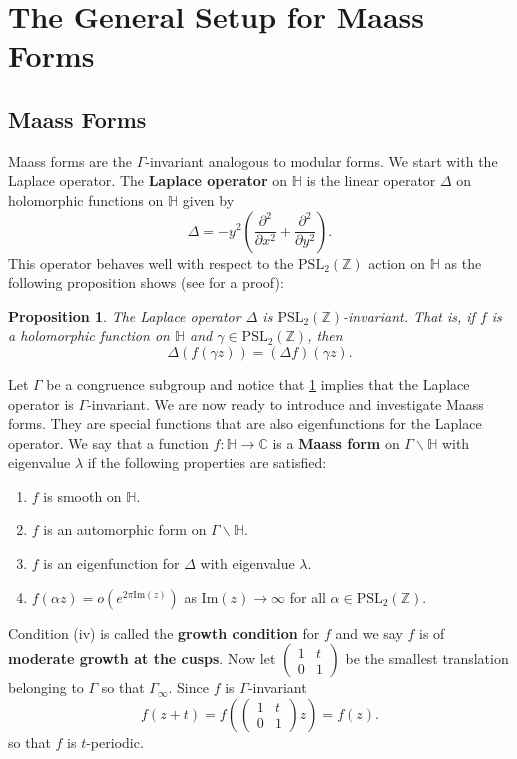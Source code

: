 \documentclass[12pt]{book}
\newtheorem{proposition}{Proposition}[section]
\theoremstyle{definition}\newframedtheorem{method}{Method}
\newcommand{\PSL}{\mathrm{PSL}}
\newcommand{\Z}{\mathbb{Z}}
\newcommand{\C}{\mathbb{C}}
\renewcommand{\H}{\mathbb{H}}
\renewcommand{\a}{\alpha}
\newcommand{\g}{\gamma}
\renewcommand{\l}{\lambda}
\newcommand{\G}{\Gamma}
\newcommand{\D}{\Delta}
\newcommand{\del}{\partial}
\newcommand{\<}{\langle}
\renewcommand{\>}{\rangle}
\renewcommand{\Im}{\mathrm{Im}}
\newcommand{\GH}{\G\backslash\H}
\begin{document}
  \section{The General Setup for Maass Forms}
    \subsection*{Maass Forms}
      Maass forms are the $\G$-invariant analogous to modular forms. We start with the Laplace operator. The \textbf{Laplace operator} on $\H$ is the linear operator $\D$ on holomorphic functions on $\H$ given by
      \[
        \D = -y^{2}\left(\frac{\del^{2}}{\del x^{2}}+\frac{\del^{2}}{\del y^{2}}\right).
      \]
      This operator behaves well with respect to the $\PSL_{2}(\Z)$ action on $\H$ as the following proposition shows (see \cite{motohashi1997spectral} for a proof):

      \begin{proposition}\label{prop:Laplace_is_invariant}
        The Laplace operator $\D$ is $\PSL_{2}(\Z)$-invariant. That is, if $f$ is a holomorphic function on $\H$ and $\g \in \PSL_{2}(\Z)$, then
        \[
          \D(f(\g z)) = (\D f)(\g z).
        \]
      \end{proposition}

      Let $\G$ be a congruence subgroup and notice that \cref{prop:Laplace_is_invariant} implies that the Laplace operator is $\G$-invariant. We are now ready to introduce and investigate Maass forms. They are special functions that are also eigenfunctions for the Laplace operator. We say that a function $f:\H \to \C$ is a \textbf{Maass form} on $\GH$ with eigenvalue $\l$ if the following properties are satisfied:
      \begin{enumerate}[label=(\roman*)]
        \item $f$ is smooth on $\H$.
        \item $f$ is an automorphic form on $\GH$.
        \item $f$ is an eigenfunction for $\D$ with eigenvalue $\l$.
        \item $f(\a z) = o(e^{2\pi\Im(z)})$ as $\Im(z) \to \infty$ for all $\a \in \PSL_{2}(\Z)$.
      \end{enumerate}
      Condition (iv) is called the \textbf{growth condition} for $f$ and we say $f$ is of \textbf{moderate growth at the cusps}. Now let $\begin{pmatrix} 1 & t \\ 0 & 1 \end{pmatrix}$ be the smallest translation belonging to $\G$ so that $\G_{\infty}$. Since $f$ is $\G$-invariant
      \[
        f(z+t) = f\left(\begin{pmatrix} 1 & t \\ 0 & 1 \end{pmatrix}z\right) = f(z).
      \]
      so that $f$ is $t$-periodic.
\end{document}
